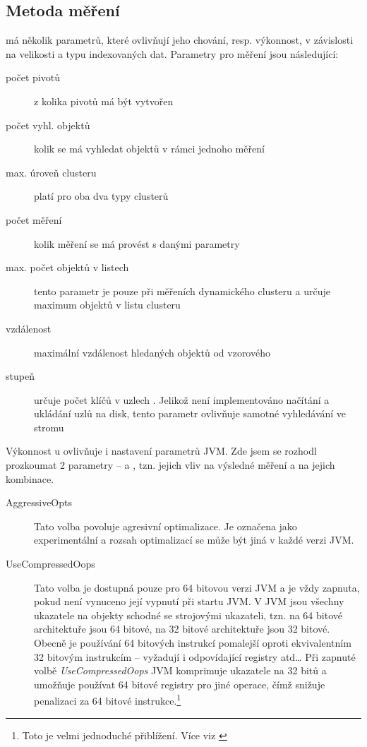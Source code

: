 \subsection{Metoda měření\label{sec:measurementmethod}}

\MIndex{} má několik parametrů, které ovlivňují jeho chování, resp. výkonnost, v závislosti na velikosti a typu indexovaných dat. Parametry pro měření jsou následující:
\begin{description}
\item[počet pivotů] z kolika pivotů má být vytvořen \MIndex{}
\item[počet vyhl. objektů] kolik se má vyhledat objektů v rámci jednoho měření
\item[max. úroveň clusteru] platí pro oba dva typy clusterů
\item[počet měření] kolik měření se má provést s danými parametry
\item[max. počet objektů v listech] tento parametr je pouze při měřeních dynamického clusteru a určuje maximum objektů v listu clusteru
\item[vzdálenost] maximální vzdálenost hledaných objektů od vzorového
\item[stupeň \BPTree{}] určuje počet klíčů v uzlech \BPTree{}. Jelikož není implementováno načítání a ukládání uzlů na disk, tento parametr ovlivňuje samotné vyhledávání ve stromu
\end{description}

Výkonnost \MIndex u ovlivňuje i nastavení parametrů JVM.
Zde jsem se rozhodl prozkoumat 2 parametry --  a , tzn. jejich vliv na výsledné měření a na jejich kombinace.

\begin{description}
\item[AggressiveOpts] Tato volba povoluje agresivní optimalizace.
Je označena jako experimentální a rozsah optimalizací se může být jiná v každé verzi JVM.
\item[UseCompressedOops] Tato volba je dostupná pouze pro 64 bitovou verzi JVM a je vždy zapnuta, pokud není vynuceno její vypnutí při startu JVM.
V JVM jsou všechny ukazatele na objekty schodné se strojovými ukazateli, tzn. na 64 bitové architektuře jsou 64 bitové, na 32 bitové architektuře jsou 32 bitové.
Obecně je používání 64 bitových instrukcí pomalejší oproti ekvivalentním 32 bitovým instrukcím -- vyžadují i odpovídající registry atd\ldots{}
Při zapnuté volbě \emph{UseCompressedOops} JVM komprimuje ukazatele na 32 bitů a umožňuje používat 64 bitové registry pro jiné operace, čímž snižuje penalizaci za 64 bitové instrukce.\footnote{Toto je velmi jednoduché přiblížení. Více viz \cite{hunt2011java}}
\end{description}


